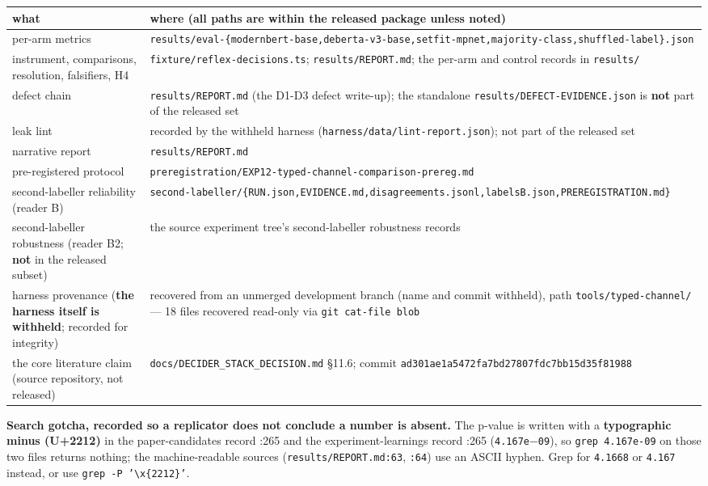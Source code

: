 \documentclass[11pt,a4paper]{article}
\begin{document}
\begin{center}
\begin{tabular}{@{}>{\raggedright\arraybackslash}p{}>{\raggedright\arraybackslash}p{}@{}}
\hline
\textbf{what} & \textbf{where (all paths are within the released package unless noted)} \\ \hline
per-arm metrics & \texttt{results/eval-\{modernbert-base,deberta-v3-base,setfit-mpnet,majority-class,shuffled-label\}.json} \\ \hline
instrument, comparisons, resolution, falsifiers, H4 & \texttt{fixture/reflex-decisions.ts}; \texttt{results/REPORT.md}; the per-arm and control records in \texttt{results/} \\ \hline
defect chain & \texttt{results/REPORT.md} (the D1-D3 defect write-up); the standalone \texttt{results/DEFECT-EVIDENCE.json} is \textbf{not} part of the released set \\ \hline
leak lint & recorded by the withheld harness (\texttt{harness/data/lint-report.json}); not part of the released set \\ \hline
narrative report & \texttt{results/REPORT.md} \\ \hline
pre-registered protocol & \texttt{preregistration/EXP12-typed-channel-comparison-prereg.md} \\ \hline
second-labeller reliability (reader B) & \texttt{second-labeller/\{RUN.json,EVIDENCE.md,disagreements.jsonl,labelsB.json,PREREGISTRATION.md\}} \\ \hline
second-labeller robustness (reader B2; \textbf{not} in the released subset) & the source experiment tree's second-labeller robustness records \\ \hline
harness provenance (\textbf{the harness itself is withheld}; recorded for integrity) & recovered from an unmerged development branch (name and commit withheld), path \texttt{tools/typed-channel/} --- 18 files recovered read-only via \texttt{git cat-file blob} \\ \hline
the core literature claim (source repository, not released) & \texttt{docs/DECIDER\_STACK\_DECISION.md} \S11.6\cite{source_decider_stack_2026}; commit \texttt{ad301ae1a5472fa7bd27807fdc7bb15d35f81988} \\ \hline
\end{tabular}
\end{center}

\textbf{Search gotcha, recorded so a replicator does not conclude a number is absent.} The p-value is written with a \textbf{typographic minus (U+2212)} in the paper-candidates record :265 and the experiment-learnings record :265 (\texttt{4.167e$-$09}), so \texttt{grep 4.167e-09} on those two files returns nothing; the machine-readable sources (\texttt{results/REPORT.md:63}, \texttt{:64}) use an ASCII hyphen. Grep for \texttt{4.1668} or \texttt{4.167} instead, or use \texttt{grep -P '\textbackslash{}x\{2212\}'}.
\end{document}
